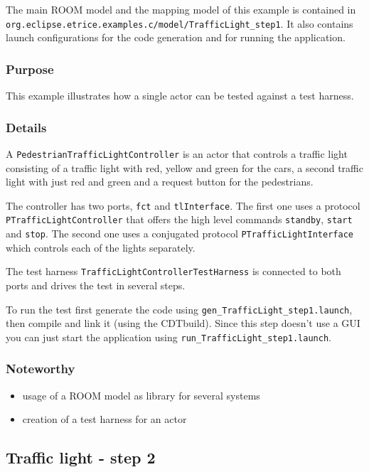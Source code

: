 The main ROOM model and the mapping model of this example is contained
in \texttt{org.eclipse.etrice.examples.c/model/TrafficLight\_step1}.
It also contains launch configurations for the code generation and for
running the application.

\subsubsection{Purpose}

This example illustrates how a single actor can be tested against a test harness.

\subsubsection{Details}

A \texttt{PedestrianTrafficLightController} is an actor that controls a traffic light
consisting of a traffic light with red, yellow and green for the cars, a second
traffic light with just red and green and a request button for the pedestrians.

The controller has two ports, \texttt{fct} and \texttt{tlInterface}. The first
one uses a protocol \texttt{PTrafficLightController} that offers the high level
commands \texttt{standby}, \texttt{start} and \texttt{stop}. The second one
uses a conjugated protocol \texttt{PTrafficLightInterface} which controls
each of the lights separately.

The test harness \texttt{TrafficLightControllerTestHarness} is connected to
both ports and drives the test in several steps.

To run the test first generate the code using \texttt{gen\_TrafficLight\_step1.launch},
then compile and link it (using the CDTbuild). Since this step doesn't use a GUI
you can just start the application using \texttt{run\_TrafficLight\_step1.launch}.

\subsubsection{Noteworthy}

\begin{itemize}
\item usage of a ROOM model as library for several systems
\item creation of a test harness for an actor 
\end{itemize}

\subsection{Traffic light - step 2}

